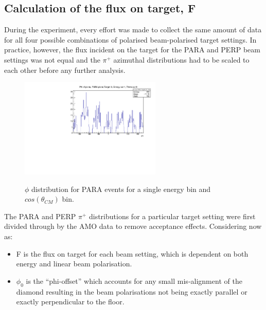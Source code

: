 \subsection{Calculation of the flux on target, F}
During the experiment, every effort was made to collect the same amount of data for all four possible combinations of polarised beam-polarised target settings. In practice, however, the flux incident on the target for the PARA and PERP beam settings was not equal and the $\pi^+$ azimuthal distributions had to be scaled to each other before any further analysis.
\begin{figure}[htb]
  \begin{center}
    \includegraphics[width=0.6\textwidth]{figures/phi_PARA.pdf} \\
    \caption{$\phi$ distribution for PARA events for a single energy bin and $cos(\theta_{CM})$ bin. }
    \label{fig:frost_PARA_ex}
  \end{center}
\end{figure}



The PARA and PERP $\pi^+$ distributions for a particular target setting were first divided through by the AMO data to remove acceptance effects.
Considering now as:
\begin{itemize}
\item F is the flux on target for each beam setting, which is dependent on both energy and linear beam polarisation. 
\item $\phi_0$ is the “phi-offset” which accounts for any small mis-alignment of the diamond resulting in the beam polarisations not being exactly parallel or exactly perpendicular to the floor.
\end{itemize}

